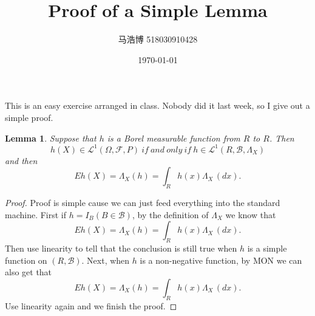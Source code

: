 \documentclass[12pt]{article}
\title{Proof of a Simple Lemma}
\author{马浩博 518030910428}
\date{\today}
\theoremstyle{mythm}
\newtheorem{lemma}[theorem]{Lemma}
\begin{document}
\maketitle

This is an easy exercise arranged in class. Nobody did it last week, so I give out a simple proof.

\begin{lemma}
	 Suppose that $h$ is a Borel measurable function from $R$ to $R$. Then
	 $$h(X) \in \mathcal{L}^1(\Omega,\mathcal{F},P) \ if \ and \ only \ if \ h \in \mathcal{L}^1(R,\mathcal{B},\Lambda_X )$$
	 and then
	 $$Eh(X) = \Lambda_X(h) = \int_{R} h(x) \Lambda_X\, (dx).$$
\end{lemma}

\begin{proof}
	Proof is simple cause we can just feed everything into the standard machine.
	First if $h = I_B (B \in \mathcal{B})$, by the definition of $\Lambda_X$ we know that $$Eh(X) = \Lambda_X(h) = \int_{R} h(x) \Lambda_X\, (dx).$$
	Then use linearity to tell that the conclusion is still true when $h$ is a simple function on $(R,\mathcal{B})$. 
	Next, when $h$ is a non-negative function, by MON we can also get that 
	$$Eh(X) = \Lambda_X(h) = \int_{R} h(x) \Lambda_X\, (dx).$$
	Use linearity again and we finish the proof.
\end{proof}
\end{document}
